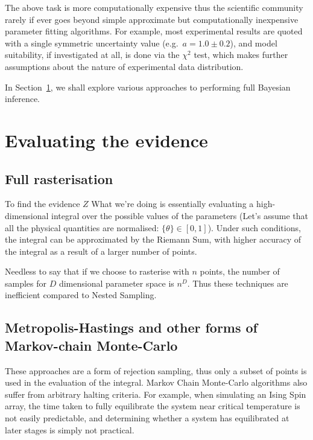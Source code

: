 \documentclass[11pt, reprint]{revtex4-2}
\begin{document}
The above task is more computationally expensive thus the scientific
community rarely if ever goes beyond simple approximate but
computationally inexpensive parameter fitting algorithms. For example,
most experimental results are quoted with a single symmetric
uncertainty value (e.g.~\(a = 1.0 \pm 0.2 \)), and model suitability,
if investigated at all, is done via the \( \chi^2 \)
test\cite{Pearson1900}, which makes further assumptions about the
nature of experimental data distribution.

In Section~\ref{sec-3}, we shall explore various approaches to
performing full Bayesian inference.

\section{Evaluating the evidence}\label{sec-3}

\subsection{Full rasterisation}\label{sec-3-1}

To find the evidence \( Z \) What we're doing is essentially
evaluating a high-dimensional integral over the possible values of the
parameters (Let's assume that all the physical quantities are
normalised: \( \lbrace \theta \rbrace \in [0, 1] \)). Under such conditions, the integral
can be approximated by the Riemann Sum, with higher accuracy of the
integral as a result of a larger number of
points.

Needless to say that if we choose to rasterise with \( n \) points,
the number of samples for \(D \) dimensional parameter space is
\( n^{D} \). Thus these techniques are inefficient compared to Nested Sampling\cite{polychord}.

\subsection{Metropolis-Hastings and other forms of Markov-chain Monte-Carlo}\label{sec-3-2}

These approaches are a form of rejection sampling, thus only a subset
of points is used in the evaluation of the integral. Markov Chain
Monte-Carlo algorithms also suffer from arbitrary halting
criteria\cite{Metropolis,Metropolis-hastings-gibbs}. For
example, when simulating an Ising Spin array, the time taken to fully
equilibrate the system near critical temperature is not easily
predictable, and determining whether a system has equilibrated at
later stages is simply not practical.\cite{me-ising}
\end{document}
